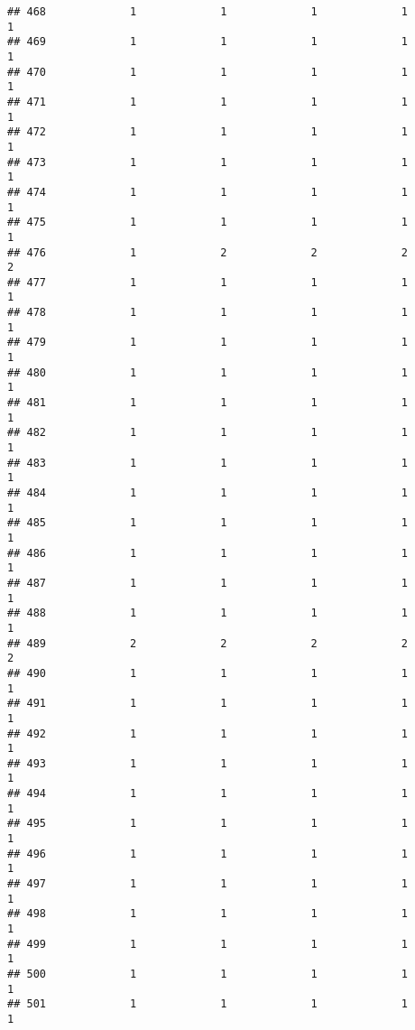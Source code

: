 \documentclass[
]{article}
\begin{document}
\begin{verbatim}
## 468             1             1             1             1             1
## 469             1             1             1             1             1
## 470             1             1             1             1             1
## 471             1             1             1             1             1
## 472             1             1             1             1             1
## 473             1             1             1             1             1
## 474             1             1             1             1             1
## 475             1             1             1             1             1
## 476             1             2             2             2             2
## 477             1             1             1             1             1
## 478             1             1             1             1             1
## 479             1             1             1             1             1
## 480             1             1             1             1             1
## 481             1             1             1             1             1
## 482             1             1             1             1             1
## 483             1             1             1             1             1
## 484             1             1             1             1             1
## 485             1             1             1             1             1
## 486             1             1             1             1             1
## 487             1             1             1             1             1
## 488             1             1             1             1             1
## 489             2             2             2             2             2
## 490             1             1             1             1             1
## 491             1             1             1             1             1
## 492             1             1             1             1             1
## 493             1             1             1             1             1
## 494             1             1             1             1             1
## 495             1             1             1             1             1
## 496             1             1             1             1             1
## 497             1             1             1             1             1
## 498             1             1             1             1             1
## 499             1             1             1             1             1
## 500             1             1             1             1             1
## 501             1             1             1             1             1

\end{verbatim}
\end{document}
